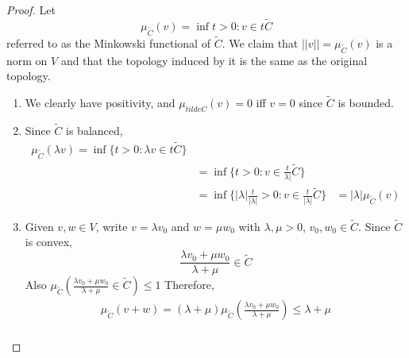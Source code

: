 \documentclass{article}
\begin{document}
\begin{proof}
    Let
    \begin{equation}
        \mu_{\tilde C}(v) = \inf{t > 0 : v \in t \tilde C}
    \end{equation}
    referred to as the Minkowski functional of $\tilde C$.
    We claim that $||v|| = \mu_{\tilde C}(v)$ is a norm on $V$ and that the topology induced by it is the same as the original topology.
    \begin{enumerate} %
        \item We clearly have positivity, and $\mu_{tilde C}(v) = 0$ iff $v = 0$ since $\tilde C$ is bounded.
        \item Since $\tilde C$ is balanced,
            \begin{align}
                \mu_{\tilde C} (\lambda v) = \inf\{t > 0 : \lambda v \in t \tilde C\} \\
                &= \inf\{t > 0: v \in \frac{t}{\lambda|} \tilde C\} \\
                &= \inf\{|\lambda| \frac{t}{|\lambda|} > 0 : v \in \frac{t}{|\lambda|} \tilde C\}
                &= |\lambda| \mu_{\tilde C}(v)
            \end{align}
        \item Given $v, w \in V$, write $v = \lambda v_0$ and $w = \mu w_0$ with $\lambda, \mu > 0$, $v_0, w_0 \in \tilde C$.
            Since $\tilde C$ is convex,
            \begin{equation}
                \frac{\lambda v_0 + \mu w_0}{\lambda + \mu} \in \tilde C
            \end{equation}
            Also $\mu_{\tilde C}(\frac{\lambda v_0 + \mu w_0}{\lambda + \mu} \in \tilde C) \leq 1$
            Therefore,
            \begin{align}
                \mu_{\tilde C} (v + w) = (\lambda + \mu) \mu_{\tilde C} (\frac{\lambda v_0 + \mu w_0}{\lambda + \mu}) \leq \lambda + \mu \\
            \end{align}
    \end{enumerate}
\end{proof}
\end{document}
